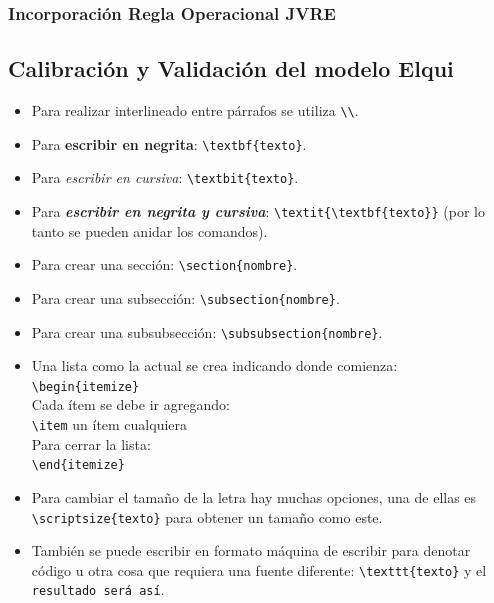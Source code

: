 \documentclass[11pt,]{article}
\begin{document}
		
		
		
		
		
		
		
		
		\subsubsection{Incorporación Regla Operacional JVRE}\bigskip
			
		\subsection{Calibración y Validación del modelo Elqui}
		

 





\begin{itemize}
\item Para realizar interlineado entre párrafos se utiliza \verb!\\!.
\item Para \textbf{escribir en negrita}: \verb!\textbf{texto}!.
\item Para \textit{escribir en cursiva}: \verb!\textbit{texto}!.
\item Para \textit{\textbf{escribir en negrita y cursiva}}: \verb!\textit{\textbf{texto}}! (por lo tanto se pueden anidar los comandos).
\item Para crear una sección: \verb!\section{nombre}!.
\item Para crear una subsección: \verb!\subsection{nombre}!.
\item Para crear una subsubsección: \verb!\subsubsection{nombre}!.
\item Una lista como la actual se crea indicando donde comienza:\\
\verb!\begin{itemize}!\\
Cada ítem se debe ir agregando:\\
\verb!\item! un ítem cualquiera\\
Para cerrar la lista:\\
\verb!\end{itemize}!\\
\item Para cambiar el tamaño de la letra hay muchas opciones, una de ellas es \verb!\scriptsize{texto}! para obtener \scriptsize{un tamaño como este}\normalsize{.} %
\item También se puede escribir en formato máquina de escribir para denotar código u otra cosa que requiera una fuente diferente: \verb!\texttt{texto}! y el \texttt{resultado será así}.
\end{itemize}
\end{document}
